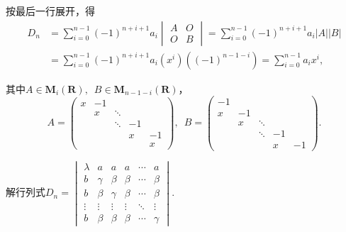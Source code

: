 \begin{solution}
    按最后一行展开，得
    \begin{align*}
        D_n & =\sum_{i=0}^{n-1}(-1)^{n+i+1}a_i\begin{vmatrix} A & O \\ O & B \end{vmatrix}
        =\sum_{i=0}^{n-1}(-1)^{n+i+1}a_i|A||B|                                                        \\
            & =\sum_{i=0}^{n-1}(-1)^{n+i+1}a_i(x^i)\left((-1)^{n-1-i}\right) =\sum_{i=0}^{n-1}a_i x^i,
    \end{align*}

    其中$A\in \mathbf{M}_i(\mathbf{R}),\enspace B\in \mathbf{M}_{n-1-i}(\mathbf{R})$，
    \[ A=\begin{pmatrix}
            x & -1 &        &    &    \\
              & x  & \ddots &    &    \\
              &    & \ddots & -1 &    \\
              &    &        & x  & -1 \\
              &    &        &    & x
        \end{pmatrix},\enspace
        B=\begin{pmatrix}
            -1 &    &        &    &    \\
            x  & -1 &        &    &    \\
               & x  & \ddots &    &    \\
               &    & \ddots & -1 &    \\
               &    &        & x  & -1
        \end{pmatrix}. \]
\end{solution}

\begin{example}{}{}
    解行列式$D_n=\begin{vmatrix}
            \lambda & a      & a      & a      & \cdots & a      \\
            b       & \gamma & \beta  & \beta  & \cdots & \beta  \\
            b       & \beta  & \gamma & \beta  & \cdots & \beta  \\
            \vdots  & \vdots & \vdots & \vdots & \ddots & \vdots \\
            b       & \beta  & \beta  & \beta  & \cdots & \gamma
        \end{vmatrix}$.
\end{example}

